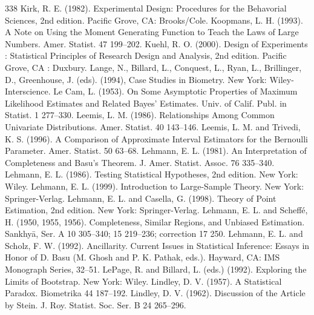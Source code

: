 \begin{thebibliography}{338}
\label{bib:source190} Kirk, R. E. (1982). Experimental Design: Procedures for the Behavorial Sciences, 2nd edition. Pacific Grove, CA: Brooks/Cole.
\label{bib:source191} Koopmans, L. H. (1993). A Note on Using the Moment Generating Function to Teach the Laws of Large Numbers. Amer. Statist. 47 199–202.
\label{bib:source192} Kuehl, R. O. (2000). Design of Experiments : Statistical Principles of Research Design and Analysis, 2nd edition. Pacific Grove, CA : Duxbury.
\label{bib:source193} Lange, N., Billard, L., Conquest, L., Ryan, L., Brillinger, D., Greenhouse, J. (eds). (1994), Case Studies in Biometry. New York: Wiley-Interscience.
\label{bib:source194} Le Cam, L. (1953). On Some Asymptotic Properties of Maximum Likelihood Estimates and Related Bayes’ Estimates. Univ. of Calif. Publ. in Statist. 1 277–330.
\label{bib:source195} Leemis, L. M. (1986). Relationships Among Common Univariate Distributions. Amer. Statist. 40 143–146.
\label{bib:source196} Leemis, L. M. and Trivedi, K. S. (1996). A Comparison of Approximate Interval Estimators for the Bernoulli Parameter. Amer. Statist. 50 63–68.
\label{bib:source197} Lehmann, E. L. (1981). An Interpretation of Completeness and Basu’s Theorem. J. Amer. Statist. Assoc. 76 335–340.
\label{bib:source198} Lehmann, E. L. (1986). Testing Statistical Hypotheses, 2nd edition. New York: Wiley.
\label{bib:source199} Lehmann, E. L. (1999). Introduction to Large-Sample Theory. New York: Springer-Verlag.
\label{bib:source200} Lehmann, E. L. and Casella, G. (1998). Theory of Point Estimation, 2nd edition. New York: Springer-Verlag.
\label{bib:source201} Lehmann, E. L. and Scheffé, H. (1950, 1955, 1956). Completeness, Similar Regions, and Unbiased Estimation. Sankhyā, Ser. A 10 305–340; 15 219–236; correction 17 250.
\label{bib:source202} Lehmann, E. L. and Scholz, F. W. (1992). Ancillarity. Current Issues in Statistical Inference: Essays in Honor of D. Basu (M. Ghosh and P. K. Pathak, eds.). Hayward, CA: IMS Monograph Series, 32–51.
\label{bib:source203} LePage, R. and Billard, L. (eds.) (1992). Exploring the Limits of Bootstrap. New York: Wiley.
\label{bib:source204} Lindley, D. V. (1957). A Statistical Paradox. Biometrika 44 187–192.
\label{bib:source205} Lindley, D. V. (1962). Discussion of the Article by Stein. J. Roy. Statist. Soc. Ser. B 24 265–296.

\end{thebibliography}

